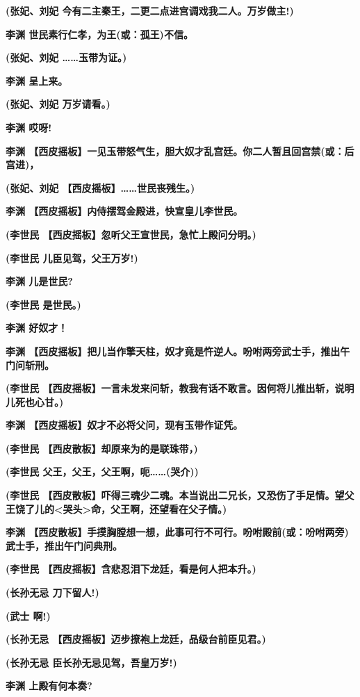 \textbf{(张妃、刘妃 今有二主秦王，二更二点进宫调戏我二人。万岁做主!)}

\textbf{李渊 世民素行仁孝，为王(或：孤王)不信。}

\textbf{(张妃、刘妃 \ldots{}\ldots{}玉带为证。)}

\textbf{李渊 呈上来。}

\textbf{(张妃、刘妃 万岁请看。)}

\textbf{李渊 哎呀!}

\textbf{李渊
【西皮摇板】一见玉带怒气生，胆大奴才乱宫廷。你二人暂且回宫禁(或：后宫进)，}

\textbf{(张妃、刘妃 【西皮摇板】\ldots{}\ldots{}世民丧残生。)}

\textbf{李渊 【西皮摇板】内侍摆驾金殿进，快宣皇儿李世民。}

\textbf{(李世民 【西皮摇板】忽听父王宣世民，急忙上殿问分明。)}

\textbf{(李世民 儿臣见驾，父王万岁!)}

\textbf{李渊 儿是世民?}

\textbf{(李世民 是世民。)}

\textbf{李渊 好奴才！}

\textbf{李渊
【西皮摇板】把儿当作擎天柱，奴才竟是忤逆人。吩咐两旁武士手，推出午门问斩刑。}

\textbf{(李世民
【西皮摇板】一言未发来问斩，教我有话不敢言。因何将儿推出斩，说明儿死也心甘。)}

\textbf{李渊 【西皮摇板】奴才不必将父问，现有玉带作证凭。}

\textbf{(李世民 【西皮散板】却原来为的是联珠带，)}

\textbf{(李世民 父王，父王，父王啊，呃\ldots{}\ldots{}(哭介))}

\textbf{(李世民
【西皮散板】吓得三魂少二魂。本当说出二兄长，又恐伤了手足情。望父王饶了儿的\textless{}哭头\textgreater{}命，父王啊，还望看在父子情。)}

\textbf{李渊
【西皮散板】手摸胸膛想一想，此事可行不可行。吩咐殿前(或：吩咐两旁)武士手，推出午门问典刑。}

\textbf{(李世民 【西皮摇板】含悲忍泪下龙廷，看是何人把本升。)}

\textbf{(长孙无忌 刀下留人!)}

\textbf{(武士 啊!)}

\textbf{(长孙无忌 【西皮摇板】迈步撩袍上龙廷，品级台前臣见君。)}

\textbf{(长孙无忌 臣长孙无忌见驾，吾皇万岁!)}

\textbf{李渊 上殿有何本奏?}

